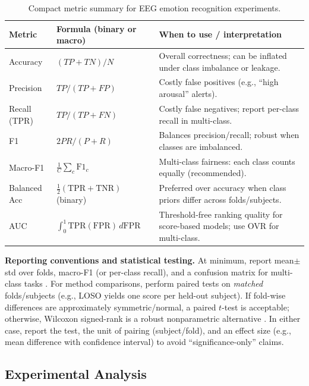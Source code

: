 \documentclass{WileyMSP-template}
\begin{document}
\begin{table}[t]
\centering
\footnotesize
\setlength{\tabcolsep}{3pt}
\renewcommand{\arraystretch}{1.2}
\begin{tabular}{|p{2.2cm}|p{4.2cm}|p{6.0cm}|}
\hline
\textbf{Metric} & \textbf{Formula (binary or macro)} & \textbf{When to use / interpretation} \\
\hline
Accuracy & $(TP+TN)/N$ & Overall correctness; can be inflated under class imbalance or leakage. \\
\hline
Precision & $TP/(TP+FP)$ & Costly false positives (e.g., ``high arousal'' alerts). \\
\hline
Recall (TPR) & $TP/(TP+FN)$ & Costly false negatives; report per-class recall in multi-class. \\
\hline
F1 & $2PR/(P+R)$ & Balances precision/recall; robust when classes are imbalanced. \\
\hline
Macro-F1 & $\frac{1}{C}\sum_c \mathrm{F1}_c$ & Multi-class fairness: each class counts equally (recommended). \\
\hline
Balanced Acc & $\frac{1}{2}(\mathrm{TPR}+\mathrm{TNR})$ (binary) & Preferred over accuracy when class priors differ across folds/subjects. \\
\hline
AUC & $\int_0^1 \mathrm{TPR}(\mathrm{FPR})\,d\mathrm{FPR}$ & Threshold-free ranking quality for score-based models; use OVR for multi-class. \\
\hline
\end{tabular}
\caption{Compact metric summary for EEG emotion recognition experiments.}
\label{tab:metrics_compact}
\end{table}

\textbf{Reporting conventions and statistical testing.}
At minimum, report mean$\pm$std over folds, macro-F1 (or per-class recall), and a confusion matrix for multi-class tasks \cite{kukhilava2025evaluation,PeerJCS2065}. For method comparisons, perform paired tests on \emph{matched} folds/subjects (e.g., LOSO yields one score per held-out subject). If fold-wise differences are approximately symmetric/normal, a paired $t$-test is acceptable; otherwise, Wilcoxon signed-rank is a robust nonparametric alternative \cite{Demsar2006}. In either case, report the test, the unit of pairing (subject/fold), and an effect size (e.g., mean difference with confidence interval) to avoid ``significance-only'' claims.



\subsection{Experimental Analysis}
\label{subsec:experimental_analysis}
\end{document}
